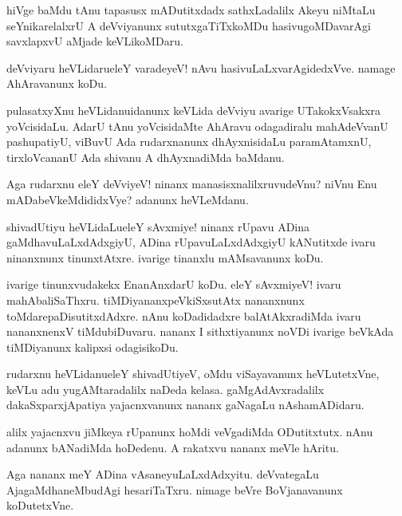 \begin{mng}
hiVge baMdu tAnu tapasusx mADutitxdadx sathxLadalilx Akeyu niMtaLu seYnikarelalxrU A deVviyanunx sututxgaTiTxkoMDu hasivugoMDavarAgi savxlapxvU aMjade keVLikoMDaru.
\end{mng}

\begin{mng}
deVviyaru heVLidaru\mdash eleY varadeyeV! nAvu hasivuLaLxvarAgidedxVve. namage AhAravanunx koDu.
\end{mng}

\begin{mng}
pulasatxyXnu heVLidanu\mdash idanunx keVLida deVviyu avarige UTakokxVsakxra yoVcisidaLu. AdarU tAnu yoVcisidaMte AhAravu odagadiralu mahAdeVvanU pashupatiyU, viBuvU Ada rudarxnanunx dhAyxnisidaLu paramAtamxnU, tirxloVcananU Ada shivanu A dhAyxnadiMda baMdanu.
\end{mng}

\begin{mng}
Aga rudarxnu eleY deVviyeV! ninanx manasisxnalilxruvudeVnu? niVnu Enu mADabeVkeMdididxVye? adanunx heVLeMdanu.
\end{mng}

\begin{mng}
shivadUtiyu heVLidaLu\mdash eleY sAvxmiye! ninanx rUpavu ADina gaMdhavuLaLxdAdxgiyU, ADina rUpavuLaLxdAdxgiyU kANutitxde ivaru ninanxnunx tinunxtAtxre. ivarige tinanxlu mAMsavanunx koDu.
\end{mng}

\begin{mng}
ivarige tinunxvudakekx EnanAnxdarU koDu. eleY sAvxmiyeV! ivaru mahAbaliSaThxru. tiMDiyananxpeVkiSxsutAtx nananxnunx toMdarepaDisutitxdAdxre. nAnu koDadidadxre balAtAkxradiMda ivaru nananxnenxV tiMdubiDuvaru. nananx I sithxtiyanunx noVDi ivarige beVkAda tiMDiyanunx kalipxsi odagisikoDu.
\end{mng}

\begin{mng}
rudarxnu heVLidanu\mdash eleY shivadUtiyeV, oMdu viSayavanunx heVLutetxVne, keVLu adu yugAMtaradalilx naDeda kelasa. gaMgAdAvxradalilx dakaSxparxjApatiya yajacnxvanunx nananx gaNagaLu nAshamADidaru.
\end{mng}

\begin{mng}
alilx yajacnxvu jiMkeya rUpanunx hoMdi veVgadiMda ODutitxtutx. nAnu adanunx bANadiMda hoDedenu. A rakatxvu nananx meVle hAritu.
\end{mng}

\begin{mng}
Aga nananx meY ADina vAsaneyuLaLxdAdxyitu. deVvategaLu AjagaMdhaneMbudAgi hesariTaTxru. nimage beVre BoVjanavanunx koDutetxVne.
\end{mng}

